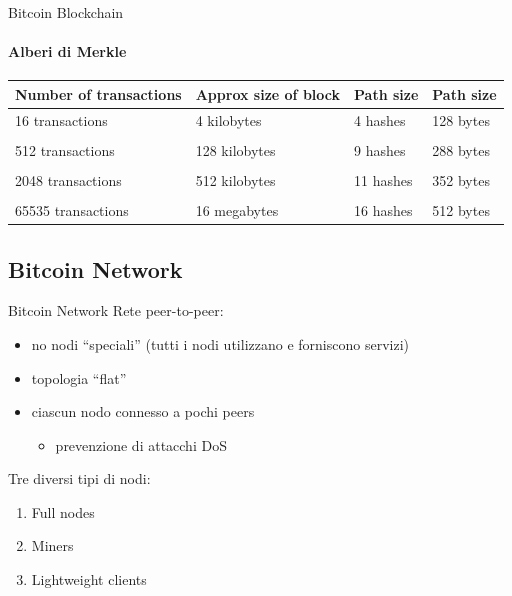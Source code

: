 \documentclass{beamer}
\begin{document}
  \begin{frame}{Bitcoin Blockchain}
  \framesubtitle{Alberi di Merkle}
      \footnotesize
       \begin{tabularx}{\textwidth}{l l l l}
         \toprule
         \textbf{Number of transactions}	& \textbf{Approx size of block} & \textbf{Path size} &	\textbf{Path size}   \\ \midrule
         16 transactions & 4 kilobytes & 4 hashes & 128 bytes \\
         \\
         512 transactions & 128 kilobytes & 9 hashes & 288 bytes \\
         \\
         2048 transactions & 512 kilobytes & 11 hashes & 352 bytes \\
         \\
         65535 transactions & 16 megabytes & 16 hashes & 512 bytes \\
         \bottomrule
     \end{tabularx}
  \end{frame}
  
  
  
  
  \subsection{Bitcoin Network}
  \begin{frame}{Bitcoin Network}
    Rete peer-to-peer:
    \begin{itemize}
        \item no nodi ``speciali'' (tutti i nodi utilizzano e forniscono servizi) 
        \item topologia ``flat''
        \item ciascun nodo connesso a pochi peers
        \begin{itemize}
            \item[\MVRightarrow] prevenzione di attacchi DoS  %
        \end{itemize}
    \end{itemize}
    
    Tre diversi tipi di nodi:
    \begin{enumerate}
        \item Full nodes
        \item Miners
        \item Lightweight clients
    \end{enumerate}
    
  \end{frame}
  
\end{document}
